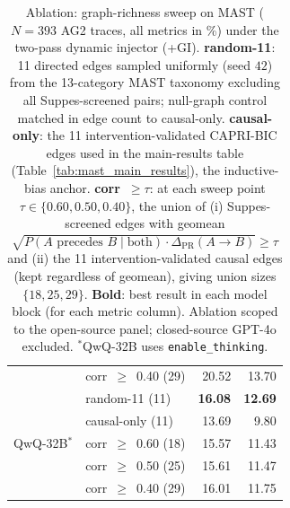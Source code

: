 \begin{table}[t]
\begin{tabular}{l l rr}
    & corr~$\geq$~0.40 (29) & 20.52              & 13.70              \\[3pt]
  \multirow{5}{*}{QwQ-32B$^{*}$}
  & random-11        (11) & \textbf{16.08}     & \textbf{12.69}     \\
    & causal-only      (11) & 13.69              &  9.80              \\
    & corr~$\geq$~0.60 (18) & 15.57              & 11.43              \\
    & corr~$\geq$~0.50 (25) & 15.61              & 11.47              \\
    & corr~$\geq$~0.40 (29) & 16.01              & 11.75              \\
  \bottomrule
  \end{tabular}
  \caption{%
    Ablation: graph-richness sweep on MAST ($N{=}393$ AG2 traces, all
    metrics in \%) under the two-pass dynamic injector (+GI).
    \textbf{random-11}: 11 directed edges sampled uniformly (seed $42$)
    from the 13-category MAST taxonomy excluding all Suppes-screened
    pairs; null-graph control matched in edge count to causal-only.
    \textbf{causal-only}: the 11 intervention-validated CAPRI-BIC edges
    used in the main-results table (Table~\ref{tab:mast_main_results}),
    the inductive-bias anchor.
    \textbf{corr~${\geq}\tau$}: at each sweep point
    $\tau\in\{0.60,0.50,0.40\}$, the union of (i) Suppes-screened edges
    with geomean
    $\sqrt{P(A\text{ precedes }B\mid\text{both})\cdot\Delta_{\mathrm{PR}}(A\!\to\!B)}\geq\tau$
    and (ii) the 11 intervention-validated causal edges (kept regardless
    of geomean), giving union sizes $\{18,25,29\}$.
  \textbf{Bold}: best result in each model block (for each metric column).
    Ablation scoped to the open-source panel; closed-source GPT-4o
    excluded. $^{*}$QwQ-32B uses \texttt{enable\_thinking}.%
  }
  \label{tab:mast_ablation_threshold_sweep}
  \end{table}
  
